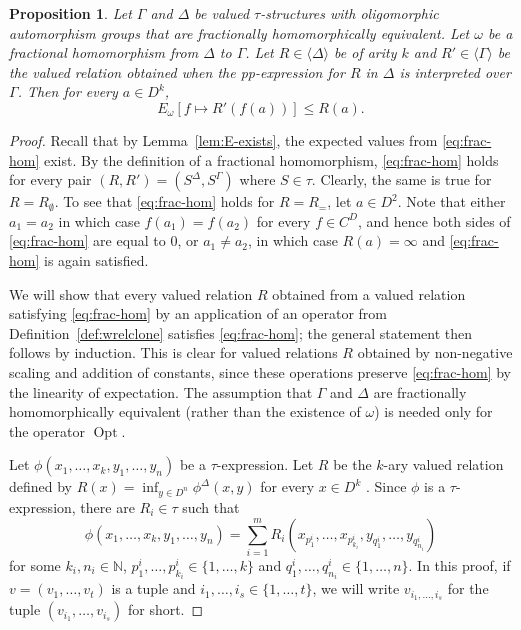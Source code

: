 \documentclass[nonacm]{acmart}
\newcommand{\N}{\mathbb N}
\DeclareMathOperator{\Opt}{Opt}
\newtheorem{proposition}[theorem]{Proposition}
\begin{document}
\begin{proposition}
\label{prop:frac-hom-expr}
Let $\Gamma$ and $\Delta$ be valued $\tau$-structures with oligomorphic automorphism groups 
that are fractionally homomorphically equivalent.
Let $\omega$ be a fractional homomorphism from $\Delta$ to $\Gamma$.
Let $R \in \langle \Delta \rangle$ be of arity $k$ and $R' \in \langle \Gamma \rangle$ be the valued relation obtained when the pp-expression for $R$ in $\Delta$ is interpreted over $\Gamma$. Then for every $a \in D^k$,
\begin{equation}
    E_{\omega}[f \mapsto R'(f(a))] \leq R(a).
    \label{eq:frac-hom}
\end{equation}
\end{proposition}
\begin{proof}
Recall that by Lemma~\ref{lem:E-exists}, the expected values from \eqref{eq:frac-hom} exist.
By the definition of a fractional homomorphism, \eqref{eq:frac-hom} holds for every pair $(R,R')=(S^\Delta, S^\Gamma)$ where $S \in \tau$. Clearly, the same is true for $R =R_{\emptyset}$. To see that \eqref{eq:frac-hom} holds for $R = R_=$, let $a \in D^2$. Note that either 
$a_1 = a_2$ in which case
$f(a_1)=f(a_2)$ for every $f \in C^D$, and hence both sides of \eqref{eq:frac-hom} are equal to $0$,
or $a_1 \neq a_2$, in which case $R(a) = \infty$ and \eqref{eq:frac-hom} is again satisfied.

We will show that every valued relation $R$ obtained from a valued relation satisfying \eqref{eq:frac-hom} by an application of an operator from Definition~\ref{def:wrelclone} satisfies \eqref{eq:frac-hom};
the general statement then follows by induction. This is clear for valued relations $R$ obtained by non-negative scaling and addition of constants, since these operations preserve \eqref{eq:frac-hom} by the linearity of expectation. The assumption that $\Gamma$ and $\Delta$ are fractionally homomorphically equivalent (rather than the existence of $\omega$) is needed only for the operator $\Opt$. 

Let $\phi(x_1,\dots,x_k, y_1, \dots, y_n)$ be a  $\tau$-expression. Let $R$ be the $k$-ary valued relation defined by $R(x)= \inf_{y\in D^n} \phi^{\Delta}(x,y)$  for every $x\in D^k$ . Since $\phi$ is a $\tau$-expression, there are $R_i\in \tau$ such that 
\[\phi(x_1,\dots,x_k, y_1, \dots, y_n)=\sum_{i=1}^m R_i(x_{p_1^i}, \dots, x_{p_{k_i}^i},y_{q_1^i}, \dots, y_{q_{n_i}^i})\]
for some $k_i, n_i \in \N$, $p_1^i, \dots, p_{k_i}^i\in \{1, \dots, k\}$ and $q_1^i, \dots, q_{n_i}^i\in \{1, \dots, n\}$.
In this proof, if $v=(v_1, \dots, v_t)$ is a tuple and $i_1,\dots, i_s \in \{1, \dots, t\}$, we will write $v_{i_1, \dots, i_s}$ for the tuple $(v_{i_1}, \dots, v_{i_s})$ for short. 


\end{proof}
\end{document}
